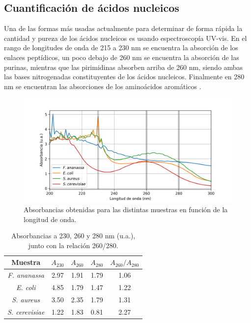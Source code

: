 \documentclass[fleqn,10pt]{SelfArx}
\begin{document}
	\subsection{Cuantificaci\'on de \'acidos nucleicos}
		Una de las formas más usadas actualmente para determinar de forma rápida la cantidad y pureza de los ácidos nucleicos es usando espectroscopía UV-vis. En el rango de longitudes de onda de 215 a 230 nm se encuentra la absorción de los enlaces peptídicos, un poco debajo de 260 nm se encuentra la absorción de las purinas, mientras que las pirimidinas absorben arriba de 260 nm, siendo ambas las bases nitrogenadas constituyentes de los ácidos nucleicos. Finalmente en 280 nm se encuentran las absorciones de los aminoácidos aromáticos \cite{sambrook2001molecular}.
		
	\begin{figure}[h]
		\centering
		\includegraphics[width=\linewidth]{plots}
		\caption{Absorbancias obtenidas para las distintas muestras en funci\'on de la longitud de onda.}
		\label{fig}
	\end{figure}	

	\begin{table}[h]
		\centering
		\caption{Absorbancias a 230, 260 y 280 nm (u.a.), junto con la relaci\'on 260/280.}
		\begin{tabular}{c|ccc|c}
			\hline
			\textbf{Muestra} & $A_{230}$ & $A_{260}$ & $A_{280}$ & $A_{260} / A_{280}$ \\
			\hline
			\textit{F. ananassa} & 2.97 & 1.91 & 1.79 & 1.06 \\
			\textit{E. coli} & 4.85 & 1.79 & 1.47 & 1.22 \\
			\textit{S. aureus} & 3.50 & 2.35 & 1.79 & 1.31 \\
			\textit{S. cerevisiae} & 1.22 & 1.83 & 0.81 & 2.27 \\
			\hline
		\end{tabular}
		\label{tb}
	\end{table}
\end{document}
